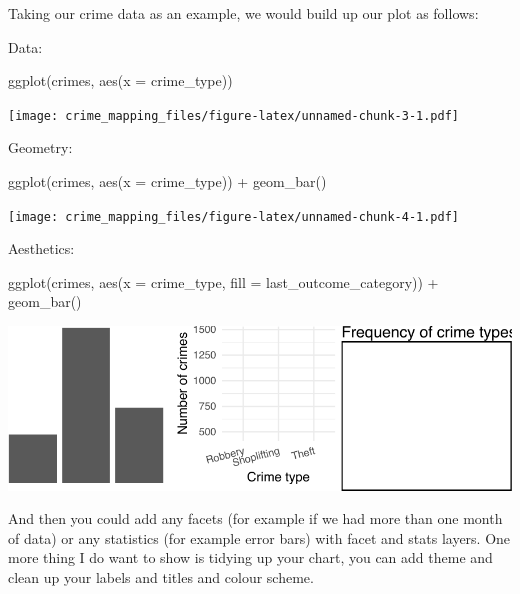 \documentclass[
]{book}
\newenvironment{Shaded}{\begin{snugshade}}{\end{snugshade}}
\newcommand{\AttributeTok}[1]{\textcolor[rgb]{0.77,0.63,0.00}{#1}}
\newcommand{\FunctionTok}[1]{\textcolor[rgb]{0.00,0.00,0.00}{#1}}
\newcommand{\NormalTok}[1]{#1}
\newcommand{\SpecialCharTok}[1]{\textcolor[rgb]{0.00,0.00,0.00}{#1}}
\begin{document}
Taking our crime data as an example, we would build up our plot as follows:

Data:

\begin{Shaded}
\begin{Highlighting}[]
\FunctionTok{ggplot}\NormalTok{(crimes, }\FunctionTok{aes}\NormalTok{(}\AttributeTok{x =}\NormalTok{ crime\_type))}
\end{Highlighting}
\end{Shaded}

\texttt{[image: crime\_mapping\_files/figure-latex/unnamed-chunk-3-1.pdf]}

Geometry:

\begin{Shaded}
\begin{Highlighting}[]
\FunctionTok{ggplot}\NormalTok{(crimes, }\FunctionTok{aes}\NormalTok{(}\AttributeTok{x =}\NormalTok{ crime\_type)) }\SpecialCharTok{+} \FunctionTok{geom\_bar}\NormalTok{()}
\end{Highlighting}
\end{Shaded}

\texttt{[image: crime\_mapping\_files/figure-latex/unnamed-chunk-4-1.pdf]}

Aesthetics:

\begin{Shaded}
\begin{Highlighting}[]
\FunctionTok{ggplot}\NormalTok{(crimes, }\FunctionTok{aes}\NormalTok{(}\AttributeTok{x =}\NormalTok{ crime\_type, }\AttributeTok{fill =}\NormalTok{ last\_outcome\_category)) }\SpecialCharTok{+} \FunctionTok{geom\_bar}\NormalTok{()}
\end{Highlighting}
\end{Shaded}

\includegraphics{crime_mapping_files/figure-latex/unnamed-chunk-5-1.pdf}

And then you could add any facets (for example if we had more than one month of data) or any statistics (for example error bars) with facet and stats layers. One more thing I do want to show is tidying up your chart, you can add theme and clean up your labels and titles and colour scheme.
\end{document}
